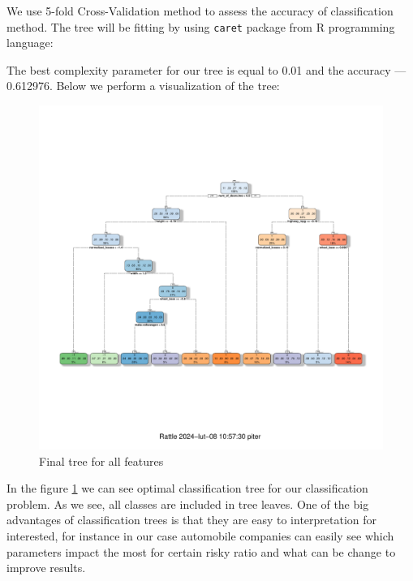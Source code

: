 \documentclass[11pt,a4paper]{article}\usepackage[]{graphicx}\usepackage[]{xcolor}
\makeatletter
\def\maxwidth{ %
  \ifdim\Gin@nat@width>\linewidth
    \linewidth
  \else
    \Gin@nat@width
  \fi
}
\newenvironment{knitrout}{}{} %
\makeatother
\begin{document}
	We use 5-fold Cross-Validation method to assess the accuracy of classification method. The tree will be fitting by using \verb|caret| package from R programming language:
	




The best complexity parameter for our tree is equal to 0.01 and the accuracy --- 0.612976. Below we perform a visualization of the tree:

\begin{knitrout}
\color{fgcolor}\begin{figure}
\includegraphics[width=\maxwidth]{figure/tree-1} \caption[Final tree for all features]{Final tree for all features}\label{fig:tree}
\end{figure}

\end{knitrout}

	In the figure \ref{fig:tree} we can see optimal classification tree for our classification problem. As we see, all classes are included in tree leaves. One of the big advantages of classification trees is that they are easy to interpretation for interested, for instance in our case automobile companies can easily see which parameters impact the most for certain risky ratio and what can be change to improve results.
	
\end{document}
